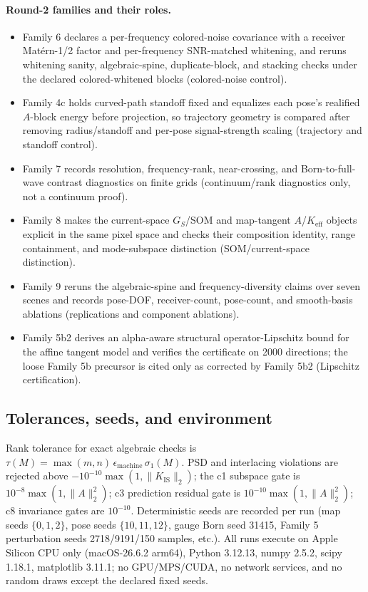 \documentclass[12pt]{article}
\begin{document}
\paragraph{Round-2 families and their roles.}
\begin{itemize}
\item Family 6 declares a per-frequency colored-noise covariance with a
receiver Mat\'ern-1/2 factor and per-frequency SNR-matched whitening, and
reruns whitening sanity, algebraic-spine, duplicate-block, and stacking
checks under the declared colored-whitened blocks (colored-noise control).
\item Family 4c holds curved-path standoff fixed and equalizes each pose's
realified $A$-block energy before projection, so trajectory geometry is
compared after removing radius/standoff and per-pose signal-strength scaling
(trajectory and standoff control).
\item Family 7 records resolution, frequency-rank, near-crossing, and
Born-to-full-wave contrast diagnostics on finite grids (continuum/rank
diagnostics only, not a continuum proof).
\item Family 8 makes the current-space $G_S$/SOM and map-tangent
$A$/$K_{\mathrm{eff}}$ objects explicit in the same pixel space and checks
their composition identity, range containment, and mode-subspace distinction
(SOM/current-space distinction).
\item Family 9 reruns the algebraic-spine and frequency-diversity claims over
seven scenes and records pose-DOF, receiver-count, pose-count, and
smooth-basis ablations (replications and component ablations).
\item Family 5b2 derives an alpha-aware structural operator-Lipschitz bound
for the affine tangent model and verifies the certificate on 2000 directions;
the loose Family 5b precursor is cited only as corrected by Family 5b2
(Lipschitz certification).
\end{itemize}

\subsection{Tolerances, seeds, and environment}

Rank tolerance for exact algebraic checks is
$\tau(M)=\max(m,n)\,\epsilon_{\mathrm{machine}}\,\sigma_1(M)$. PSD and
interlacing violations are rejected above
$-10^{-10}\max(1,\|K_{\mathrm{IS}}\|_2)$; the c1 subspace gate is
$10^{-8}\max(1,\|A\|_2^2)$; c3 prediction residual gate is
$10^{-10}\max(1,\|A\|_2^2)$; c8 invariance gates are $10^{-10}$. Deterministic
seeds are recorded per run (map seeds $\{0,1,2\}$, pose seeds
$\{10,11,12\}$, gauge Born seed 31415, Family 5 perturbation seeds
2718/9191/150 samples, etc.). All runs execute on Apple Silicon CPU only
(macOS-26.6.2 arm64), Python 3.12.13, numpy 2.5.2, scipy 1.18.1, matplotlib
3.11.1; no GPU/MPS/CUDA, no network services, and no random draws except the
declared fixed seeds.
\end{document}
